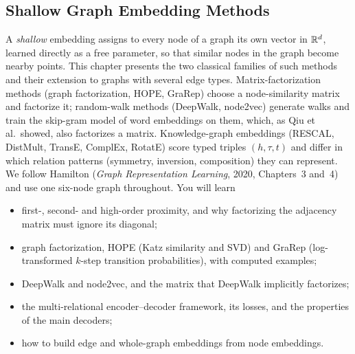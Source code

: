 \begin{notechapter}
\forgetcs\frobnorm\newcommand{\frobnorm}[1]{\left\| #1 \right\|_F}
\forgetcs\adj\newcommand{\adj}{\mathbf{A}}
\forgetcs\degree\newcommand{\degree}{\mathbf{D}}
\forgetcs\lamark\newcommand{\lamark}{\mathbf{L}}
\forgetcs\embed\newcommand{\embed}{\mathbf{Y}}
\forgetcs\similarity\newcommand{\similarity}{\mathbf{S}}
\forgetcs\transition\newcommand{\transition}{\mathbf{P}}
\forgetcs\identity\newcommand{\identity}{\mathbf{I}}
\forgetcs\vect\newcommand{\vect}[1]{\mathbf{#1}}
\chapter{Shallow Graph Embedding Methods}\label{ch:shallow-embeddings}

\begin{chapterintro}
A \emph{shallow} embedding assigns to every node of a graph its own vector in $\mathbb{R}^d$, learned directly as a free parameter, so that similar nodes in the graph become nearby points. This chapter presents the two classical families of such methods and their extension to graphs with several edge types. Matrix-factorization methods (graph factorization, HOPE, GraRep) choose a node-similarity matrix and factorize it; random-walk methods (DeepWalk, node2vec) generate walks and train the skip-gram model of word embeddings on them, which, as Qiu et al.\ showed, also factorizes a matrix. Knowledge-graph embeddings (RESCAL, DistMult, TransE, ComplEx, RotatE) score typed triples $(h, \tau, t)$ and differ in which relation patterns (symmetry, inversion, composition) they can represent. We follow Hamilton (\emph{Graph Representation Learning}, 2020, Chapters~3 and~4) and use one six-node graph throughout. You will learn
\begin{itemize}[nosep]
  \item first-, second- and high-order proximity, and why factorizing the adjacency matrix must ignore its diagonal;
  \item graph factorization, HOPE (Katz similarity and SVD) and GraRep (log-transformed $k$-step transition probabilities), with computed examples;
  \item DeepWalk and node2vec, and the matrix that DeepWalk implicitly factorizes;
  \item the multi-relational encoder--decoder framework, its losses, and the properties of the main decoders;
  \item how to build edge and whole-graph embeddings from node embeddings.
\end{itemize}
\end{chapterintro}


\end{notechapter}
